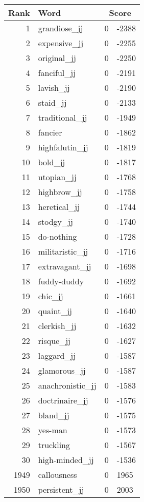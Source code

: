\begin{longtable}[!htbp]{| rlr@{.}l |}
    \hline
    \textbf{Rank} & \textbf{Word} & \multicolumn{2}{c|}{\textbf{Score}} \\
    \hline
    \endhead
    1 & grandiose\_jj & 0 & -2388 \\
    2 & expensive\_jj & 0 & -2255 \\
    3 & original\_jj & 0 & -2250 \\
    4 & fanciful\_jj & 0 & -2191 \\
    5 & lavish\_jj & 0 & -2190 \\
    6 & staid\_jj & 0 & -2133 \\
    7 & traditional\_jj & 0 & -1949 \\
    8 & fancier & 0 & -1862 \\
    9 & highfalutin\_jj & 0 & -1819 \\
    10 & bold\_jj & 0 & -1817 \\
    11 & utopian\_jj & 0 & -1768 \\
    12 & highbrow\_jj & 0 & -1758 \\
    13 & heretical\_jj & 0 & -1744 \\
    14 & stodgy\_jj & 0 & -1740 \\
    15 & do-nothing & 0 & -1728 \\
    16 & militaristic\_jj & 0 & -1716 \\
    17 & extravagant\_jj & 0 & -1698 \\
    18 & fuddy-duddy & 0 & -1692 \\
    19 & chic\_jj & 0 & -1661 \\
    20 & quaint\_jj & 0 & -1640 \\
    21 & clerkish\_jj & 0 & -1632 \\
    22 & risque\_jj & 0 & -1627 \\
    23 & laggard\_jj & 0 & -1587 \\
    24 & glamorous\_jj & 0 & -1587 \\
    25 & anachronistic\_jj & 0 & -1583 \\
    26 & doctrinaire\_jj & 0 & -1576 \\
    27 & bland\_jj & 0 & -1575 \\
    28 & yes-man & 0 & -1573 \\
    29 & truckling & 0 & -1567 \\
    30 & high-minded\_jj & 0 & -1536 \\
    1949 & callousness & 0 & 1965 \\
    1950 & persistent\_jj & 0 & 2003 \\

\end{longtable}
